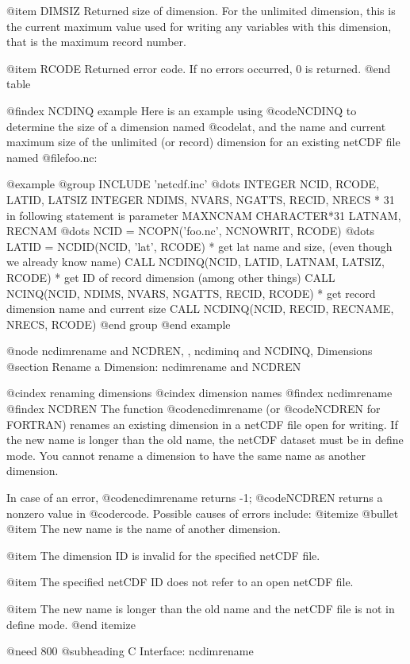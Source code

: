 @item DIMSIZ
Returned size of dimension.  For the unlimited dimension, this is
the current maximum value used for writing any variables with this
dimension, that is the maximum record number.

@item RCODE
Returned error code.  If no errors occurred, 0 is returned.
@end table

@findex NCDINQ example
Here is an example using @code{NCDINQ} to determine the size of a
dimension named @code{lat}, and the name and current maximum size of the
unlimited (or record) dimension for an existing netCDF file named
@file{foo.nc}:

@example
@group
      INCLUDE 'netcdf.inc'
         @dots{}
      INTEGER NCID, RCODE, LATID, LATSIZ
      INTEGER NDIMS, NVARS, NGATTS, RECID, NRECS
* 31 in following statement is parameter MAXNCNAM
      CHARACTER*31 LATNAM, RECNAM
         @dots{}
      NCID = NCOPN('foo.nc', NCNOWRIT, RCODE)
         @dots{}
      LATID = NCDID(NCID, 'lat', RCODE)
* get lat name and size, (even though we already know name)
      CALL NCDINQ(NCID, LATID, LATNAM, LATSIZ, RCODE)
* get ID of record dimension (among other things)
      CALL NCINQ(NCID, NDIMS, NVARS, NGATTS, RECID, RCODE)
* get record dimension name and current size
      CALL NCDINQ(NCID, RECID, RECNAME, NRECS, RCODE)
@end group
@end example

@node ncdimrename and NCDREN,  , ncdiminq and NCDINQ, Dimensions
@section Rename a Dimension:  ncdimrename and NCDREN

@cindex renaming dimensions
@cindex dimension names
@findex ncdimrename
@findex NCDREN
The function @code{ncdimrename} (or @code{NCDREN} for FORTRAN) renames
an existing dimension in a netCDF file open for writing.  If the new
name is longer than the old name, the netCDF dataset must be in define
mode.  You cannot rename a dimension to have the same name as another
dimension.

In case of an error, @code{ncdimrename} returns -1; @code{NCDREN} returns a
nonzero value in @code{rcode}.  Possible causes of errors include:
@itemize @bullet
@item
The new name is the name of another dimension.

@item
The dimension ID is invalid for the specified netCDF file.

@item
The specified netCDF ID does not refer to an open netCDF file.

@item
The new name is longer than the old name and the netCDF file is not in
define mode.
@end itemize

@need 800
@subheading C Interface:  ncdimrename

